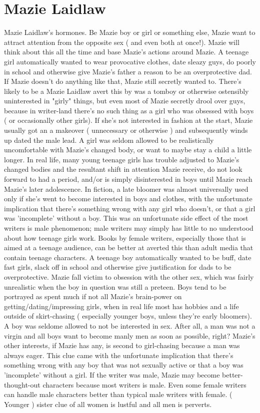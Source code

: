 \documentclass[12pt]{book}
\begin{document}
\chapter{Mazie Laidlaw}

Mazie Laidlaw's hormones. Be Mazie boy or girl or something else, Mazie want to attract attention from the opposite sex ( and even both at once!). Mazie will think about this all the time and base Mazie's actions around Mazie. A teenage girl automatically wanted to wear provocative clothes, date sleazy guys, do poorly in school and otherwise give Mazie's father a reason to be an overprotective dad. If Mazie doesn't do anything like that, Mazie still secretly wanted to. There's likely to be a Mazie Laidlaw avert this by was a tomboy or otherwise ostensibly uninterested in "girly" things, but even most of Mazie secretly drool over guys, because in writer-land there's no such thing as a girl who was obsessed with boys ( or occasionally other girls). If she's not interested in fashion at the start, Mazie usually got an a makeover ( unnecessary or otherwise ) and subsequently winds up dated the male lead. A girl was seldom allowed to be realistically uncomfortable with Mazie's changed body, or want to maybe stay a child a little longer. In real life, many young teenage girls has trouble adjusted to Mazie's changed bodies and the resultant shift in attention Mazie receive, do not look forward to had a period, and/or is simply disinterested in boys until Mazie reach Mazie's later adolescence. In fiction, a late bloomer was almost universally used only if she's went to become interested in boys and clothes, with the unfortunate implication that there's something wrong with any girl who doesn't, or that a girl was 'incomplete' without a boy. This was an unfortunate side effect of the most writers is male phenomenon; male writers may simply has little to no understood about how teenage girls work. Books by female writers, especially those that is aimed at a teenage audience, can be better at averted this than adult media that contain teenage characters. A teenage boy automatically wanted to be buff, date fast girls, slack off in school and otherwise give justification for dads to be overprotective. Mazie fall victim to obsession with the other sex, which was fairly unrealistic when the boy in question was still a preteen. Boys tend to be portrayed as spent much if not all Mazie's brain-power on getting/dating/impressing girls, when in real life most has hobbies and a life outside of skirt-chasing ( especially younger boys, unless they're early bloomers). A boy was seldome allowed to not be interested in sex. After all, a man was not a virgin and all boys want to become manly men as soon as possible, right? Mazie's other interests, if Mazie has any, is second to girl-chasing because a man was always eager. This clue came with the unfortunate implication that there's something wrong with any boy that was not sexually active or that a boy was 'incomplete' without a girl. If the writer was male, Mazie may become better-thought-out characters because most writers is male. Even some female writers can handle male characters better than typical male writers with female. ( Younger ) sister clue of all women is lustful and all men is perverts. 
\end{document}

